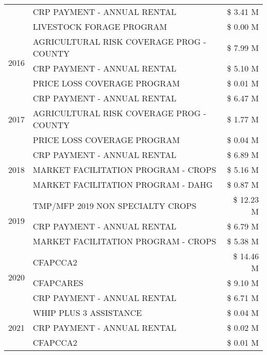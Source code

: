 \begin{tabular}{llr}
 & CRP PAYMENT - ANNUAL RENTAL & \$ 3.41 M \\
 & LIVESTOCK FORAGE PROGRAM & \$ 0.00 M \\
\cline{1-3}
\multirow[t]{3}{*}{2016} & AGRICULTURAL RISK COVERAGE PROG - COUNTY & \$ 7.99 M \\
 & CRP PAYMENT - ANNUAL RENTAL & \$ 5.10 M \\
 & PRICE LOSS COVERAGE PROGRAM & \$ 0.01 M \\
\cline{1-3}
\multirow[t]{3}{*}{2017} & CRP PAYMENT - ANNUAL RENTAL & \$ 6.47 M \\
 & AGRICULTURAL RISK COVERAGE PROG - COUNTY & \$ 1.77 M \\
 & PRICE LOSS COVERAGE PROGRAM & \$ 0.04 M \\
\cline{1-3}
\multirow[t]{3}{*}{2018} & CRP PAYMENT - ANNUAL RENTAL & \$ 6.89 M \\
 & MARKET FACILITATION PROGRAM - CROPS & \$ 5.16 M \\
 & MARKET FACILITATION PROGRAM - DAHG & \$ 0.87 M \\
\cline{1-3}
\multirow[t]{3}{*}{2019} & TMP/MFP 2019 NON SPECIALTY CROPS & \$ 12.23 M \\
 & CRP PAYMENT - ANNUAL RENTAL & \$ 6.79 M \\
 & MARKET FACILITATION PROGRAM - CROPS & \$ 5.38 M \\
\cline{1-3}
\multirow[t]{3}{*}{2020} & CFAPCCA2 & \$ 14.46 M \\
 & CFAPCARES & \$ 9.10 M \\
 & CRP PAYMENT - ANNUAL RENTAL & \$ 6.71 M \\
\cline{1-3}
\multirow[t]{3}{*}{2021} & WHIP PLUS 3 ASSISTANCE & \$ 0.04 M \\
 & CRP PAYMENT - ANNUAL RENTAL & \$ 0.02 M \\
 & CFAPCCA2 & \$ 0.01 M \\
\cline{1-3}
\bottomrule
\end{tabular}
